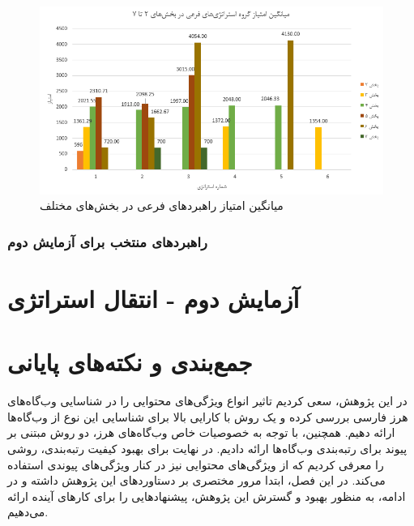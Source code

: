 \documentclass[twoside, a4paper,11pt]{book}
\numberwithin{equation}{chapter}
\numberwithin{table}{chapter}
\numberwithin{figure}{chapter}
\numberwithin{equation}{chapter}
\begin{document}
\begin{figure}
\centering
\includegraphics[scale=0.8]{Figures/notMainStrAvg.png}
\caption{\label{fig:notMainStrAvg}
میانگین امتیاز راهبردهای فرعی در بخش‌های مختلف
}
\end{figure}


\subsection{راهبردهای منتخب برای آزمایش دوم}



\chapter{آزمایش دوم - انتقال استراتژی}
\label{chapter:conclusion}
\thispagestyle{plain}

\chapter{جمع‌بندی و نکته‌های پایانی}
\label{chapter:conclusion}
\thispagestyle{plain}
در این پژوهش، سعی کردیم تاثیر انواع ویژگی‌های محتوایی را در شناسایی وب‌گاه‌های هرز فارسی بررسی کرده و یک روش با کارایی بالا برای شناسایی این نوع از وب‌گاه‌ها ارائه دهیم. همچنین، با توجه به خصوصیات خاص وب‌گاه‌های هرز، دو روش مبتنی بر پیوند برای رتبه‌بندی وب‌گاه‌ها ارائه دادیم. در نهایت برای بهبود کیفیت رتبه‌بندی، روشی را معرفی کردیم که از ویژگی‌های محتوایی نیز در کنار ویژگی‌های پیوندی استفاده می‌کند. در این فصل، ابتدا مرور مختصری بر دستاوردهای این پژوهش داشته و در ادامه، به منظور بهبود و گسترش این پژوهش، پیشنهادهایی را برای کارهای آینده ارائه می‌دهیم. 



\newpage
\thispagestyle{empty}
\mbox{}

\linespread{1}
\end{document}
